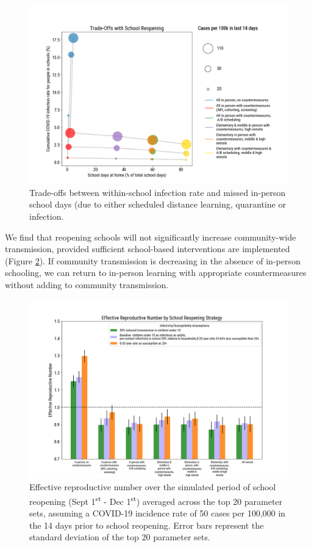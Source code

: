 \documentclass[preprint,12pt]{elsarticle}
\begin{document}
\begin{figure}[h]
    \centering
    \includegraphics[scale=0.48]{tradeoffs_2020-08-06.png}
    \caption{Trade-offs between within-school infection rate and missed in-person school days (due to either scheduled distance learning, quarantine or infection.}
    \label{fig:tradeoffs}
\end{figure}

We find that reopening schools will not significantly increase community-wide transmission, provided sufficient school-based interventions are implemented (Figure \ref{fig:reff}). If community transmission is decreasing in the absence of in-person schooling, we can return to in-person learning with appropriate countermeasures without adding to community transmission. 

\begin{figure}[h]
    \centering
    \includegraphics[scale=0.4]{r_eff_2020-08-13.png}
    \caption{Effective reproductive number over the simulated period of school reopening (Sept 1\textsuperscript{st} - Dec 1\textsuperscript{st}) averaged across the top 20 parameter sets, assuming a COVID-19 incidence rate of 50 cases per 100,000 in the 14 days prior to school reopening. Error bars represent the standard deviation of the top 20 parameter sets.}
    \label{fig:reff}
\end{figure}
\end{document}
